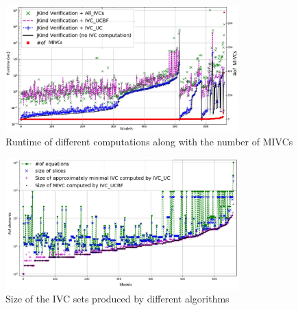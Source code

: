 



 \begin{figure}
 \centering
  \includegraphics[width=0.8\textwidth]{figs/size.jpg}
  \caption{Runtime of different computations along with the number of MIVCs}
  \vspace{0.1in}
  \label{fig:modelsize}
\end{figure}


\begin{figure}
  \centering
  \includegraphics[width=0.8\textwidth]{figs/min.jpg}
  \vspace{-0.2in}
  \caption{Size of the IVC sets produced by different algorithms}
 \label{fig:size}
\end{figure}


